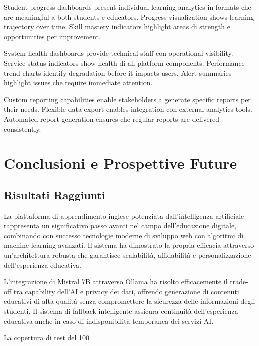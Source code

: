 \documentclass[12pt,a4paper]{article}
\begin{document}
Student progress dashboards present individual learning analytics in formats che are meaningful a both students e educators. Progress visualization shows learning trajectory over time. Skill mastery indicators highlight areas di strength e opportunities per improvement.

System health dashboards provide technical staff con operational visibility. Service status indicators show health di all platform components. Performance trend charts identify degradation before it impacts users. Alert summaries highlight issues che require immediate attention.

Custom reporting capabilities enable stakeholders a generate specific reports per their needs. Flexible data export enables integration con external analytics tools. Automated report generation ensures che regular reports are delivered consistently.

\section{Conclusioni e Prospettive Future}

\subsection{Risultati Raggiunti}

La piattaforma di apprendimento inglese potenziata dall'intelligenza artificiale rappresenta un significativo passo avanti nel campo dell'educazione digitale, combinando con successo tecnologie moderne di sviluppo web con algoritmi di machine learning avanzati. Il sistema ha dimostrato la propria efficacia attraverso un'architettura robusta che garantisce scalabilità, affidabilità e personalizzazione dell'esperienza educativa.

L'integrazione di Mistral 7B attraverso Ollama ha risolto efficacemente il trade-off tra capability dell'AI e privacy dei dati, offrendo generazione di contenuti educativi di alta qualità senza compromettere la sicurezza delle informazioni degli studenti. Il sistema di fallback intelligente assicura continuità dell'esperienza educativa anche in caso di indisponibilità temporanea dei servizi AI.

La copertura di test del 100%
\end{document}
